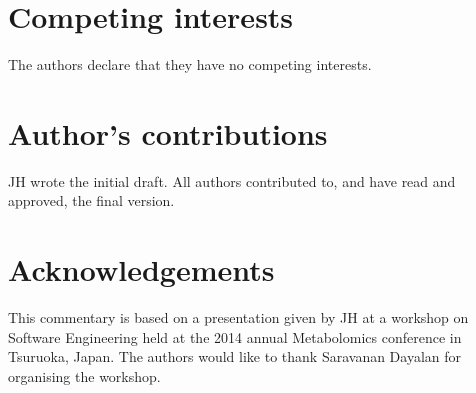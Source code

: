 \documentclass{bmcart}
\begin{document}
\begin{backmatter}

\section*{Competing interests}
  The authors declare that they have no competing interests.

\section*{Author's contributions}
    JH wrote the initial draft. All authors contributed to, and have read and approved, the final version. 

\section*{Acknowledgements}
  This commentary is based on a presentation given by JH at a workshop on Software Engineering held at the 2014 annual Metabolomics conference in Tsuruoka, Japan. The authors would like to thank Saravanan Dayalan for organising the workshop. 





\end{backmatter}
\end{document}
